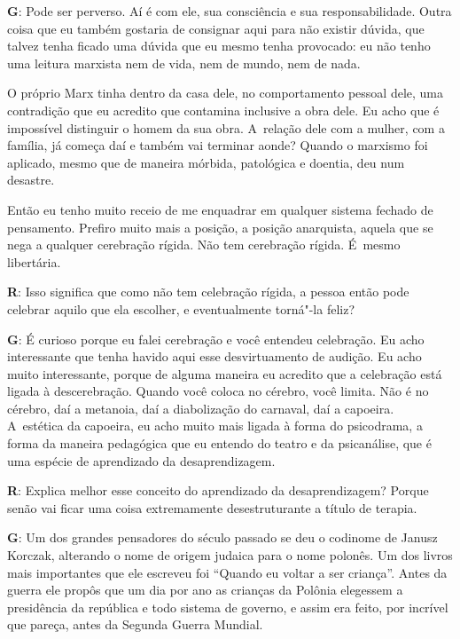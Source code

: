 \textbf{G}: Pode ser perverso. Aí é com ele, sua consciência e sua
responsabilidade. Outra coisa que eu também gostaria de consignar aqui
para não existir dúvida, que talvez tenha ficado uma dúvida que eu mesmo
tenha provocado: eu não tenho uma leitura marxista nem de vida, nem de
mundo, nem de nada.

 

O próprio Marx tinha dentro da casa dele, no comportamento pessoal dele,
uma contradição que eu acredito que contamina inclusive a obra dele. Eu
acho que é impossível distinguir o homem da sua obra. A~relação dele com
a mulher, com a família, já começa daí e também vai terminar aonde?
Quando o marxismo foi aplicado, mesmo que de maneira mórbida, patológica
e doentia, deu num desastre.

 

Então eu tenho muito receio de me enquadrar em qualquer sistema fechado
de pensamento. Prefiro muito mais a posição, a posição anarquista,
aquela que se nega a qualquer cerebração rígida. Não tem cerebração
rígida. É~mesmo libertária.

 

\textbf{R}: Isso significa que como não tem celebração rígida, a pessoa
então pode celebrar aquilo que ela escolher, e eventualmente torná"-la
feliz?

 

\textbf{G}: É curioso porque eu falei cerebração e você entendeu
celebração. Eu acho interessante que tenha havido aqui esse
desvirtuamento de audição. Eu acho muito interessante, porque de alguma
maneira eu acredito que a celebração está ligada à descerebração.
Quando você coloca no cérebro, você limita. Não é no cérebro, daí a
metanoia, daí a diabolização do carnaval, daí a capoeira. A~estética da
capoeira, eu acho muito mais ligada à forma do psicodrama, a forma da
maneira pedagógica que eu entendo do teatro e da psicanálise, que é uma
espécie de aprendizado da desaprendizagem.

 

\textbf{R}: Explica melhor esse conceito do aprendizado da
desaprendizagem? Porque senão vai ficar uma coisa extremamente
desestruturante a título de terapia.

 

\textbf{G}: Um dos grandes pensadores do século passado se deu o
codinome de Janusz Korczak, alterando o nome de origem judaica para o
nome polonês. Um dos livros mais importantes que ele escreveu foi
``Quando eu voltar a ser criança''. Antes da guerra ele propôs que um
dia por ano as crianças da Polônia elegessem a presidência da república
e todo sistema de governo, e assim era feito, por incrível que pareça,
antes da Segunda Guerra Mundial.

